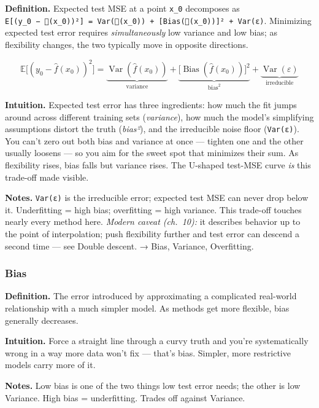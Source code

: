 \documentclass[
  10pt,
  letterpaper,
  onecolumn]{article}
\begin{document}
\textbf{Definition.} Expected test MSE at a point \texttt{x\_0}
decomposes as
\texttt{E{[}(y\_0\ −\ (x\_0))²{]}\ =\ Var((x\_0))\ +\ {[}Bias((x\_0)){]}²\ +\ Var(ε)}.
Minimizing expected test error requires \emph{simultaneously} low
variance and low bias; as flexibility changes, the two typically move in
opposite directions.

\begin{equation*}
\mathbb{E}\bigl[(y_0-\hat f(x_0))^2\bigr]
=\underbrace{\operatorname{Var}(\hat f(x_0))}_{\text{variance}}
+\underbrace{\bigl[\operatorname{Bias}(\hat f(x_0))\bigr]^2}_{\text{bias}^2}
+\underbrace{\operatorname{Var}(\varepsilon)}_{\text{irreducible}}
\end{equation*}

\textbf{Intuition.} Expected test error has three ingredients: how much
the fit jumps around across different training sets (\emph{variance}),
how much the model's simplifying assumptions distort the truth
(\emph{bias²}), and the irreducible noise floor (\texttt{Var(ε)}). You
can't zero out both bias and variance at once --- tighten one and the
other usually loosens --- so you aim for the sweet spot that minimizes
their sum. As flexibility rises, bias falls but variance rises. The
U-shaped test-MSE curve \emph{is} this trade-off made visible.

\textbf{Notes.} \texttt{Var(ε)} is the irreducible error; expected test
MSE can never drop below it. Underfitting = high bias; overfitting =
high variance. This trade-off touches nearly every method here.
\emph{Modern caveat (ch.~10):} it describes behavior up to the point of
interpolation; push flexibility further and test error can descend a
second time --- see Double descent. → Bias, Variance, Overfitting.

\hypertarget{bias}{%
\subsubsection{Bias}\label{bias}}

\textbf{Definition.} The error introduced by approximating a complicated
real-world relationship with a much simpler model. As methods get more
flexible, bias generally decreases.

\textbf{Intuition.} Force a straight line through a curvy truth and
you're systematically wrong in a way more data won't fix --- that's
bias. Simpler, more restrictive models carry more of it.

\textbf{Notes.} Low bias is one of the two things low test error needs;
the other is low Variance. High bias = underfitting. Trades off against
Variance.
\end{document}
